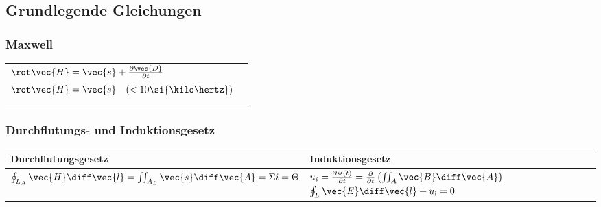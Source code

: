 \begin{sectionbox}
\subsection{Grundlegende Gleichungen}
\subsubsection{Maxwell}

\begin{tabularx}{\columnwidth}{>{\centering\arraybackslash}m{}|>{\centering\arraybackslash}m{}}
$\rot \vec{H} = \vec{s} + \frac{\partial\vec{D}}{\partial t}$  & \multirow{2}{*}{$\rot\vec{E} = - \frac{\partial\vec{B}}{\partial t}$} \\
$\rot \vec{H} = \vec{s} \quad (< 10\si{\kilo\hertz})$ & \\
\hline
\multirow{2}{*}{$\div\vec B = 0$} & \multirow{2}{*}{$\div\vec D = \gamma$} \\
 & \\
\end{tabularx}

\subsubsection{Durchflutungs- und Induktionsgesetz}
\begin{tabularx}{\columnwidth}{>{\centering\arraybackslash}m{}|>{\centering\arraybackslash}m{}}
\textbf{Durchflutungsgesetz} & \textbf{Induktionsgesetz}\\
\hline
\vspace{3pt}$\oint_{L_A}\vec{H}\diff\vec{l} = \iint_{A_L}\vec{s}\diff\vec{A} = \Sigma i = \Theta$ & \vspace{3pt}\mbox{$u_i = \frac{\partial\Psi(t)}{\partial t} = \frac{\partial}{\partial t}\left(\iint_A \vec{B}\diff\vec{A}\right)$}
$\oint_L \vec{E}\diff\vec{l} + u_\text{i} = 0$\\
\end{tabularx}


\end{sectionbox}
